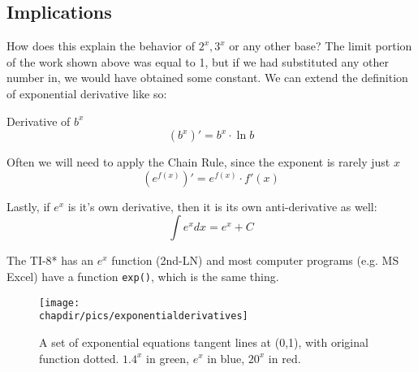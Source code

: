 
\subsection{Implications}
How does this explain the behavior of $2^x, 3^x$ or any other base?  The limit portion of
the work shown above was equal to 1, but if we had substituted any other number in,
we would have obtained some constant.  We can extend the definition of exponential
derivative like so:

\begin{derivation}{Derivative of $b^x$}
$$
(b^x)' = b^x \cdot{} \ln{b}
$$
\end{derivation}

Often we will need to apply the Chain Rule, since the exponent is rarely just $x$
$$
\left(e^{f(x)}\right)' = e^{f(x)} \cdot f'(x)
$$

Lastly, if $e^x$ is it's own derivative, then it is its own anti-derivative as well:
$$
\int e^xdx = e^x + C
$$

The TI-8* has an $e^x$ function (2nd-LN) and most computer programs (e.g. MS Excel)
have a function \texttt{exp()}, which is the same thing.

\begin{figure}
\begin{centering}
\texttt{[image: \\chapdir/pics/exponentialderivatives]}
\caption[Exponential tangent lines at (0,1)]{A set of exponential equations tangent lines at (0,1), with original function dotted.  $1.4^x$ in green, $e^x$ in blue, $20^x$ in red.}
\end{centering}
\end{figure}